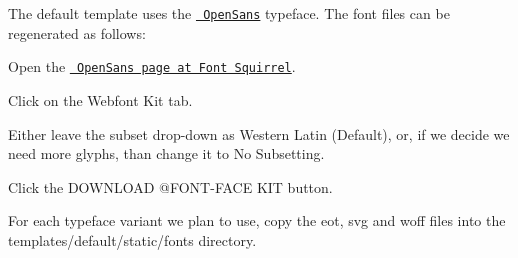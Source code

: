 The default template uses the \href{https://www.google.com/fonts/specimen/Open+Sans}{\texttt{ Open\+Sans}} typeface. The font files can be regenerated as follows\+:


\begin{DoxyEnumerate}
\item Open the \href{http://www.fontsquirrel.com/fonts/open-sans}{\texttt{ Open\+Sans page at Font Squirrel}}.
\item Click on the \textquotesingle{}Webfont Kit\textquotesingle{} tab.
\item Either leave the subset drop-\/down as \textquotesingle{}Western Latin (Default)\textquotesingle{}, or, if we decide we need more glyphs, than change it to \textquotesingle{}No Subsetting\textquotesingle{}.
\item Click the \textquotesingle{}D\+O\+W\+N\+L\+O\+AD @\+F\+O\+NT-\/F\+A\+CE K\+IT\textquotesingle{} button.
\item For each typeface variant we plan to use, copy the \textquotesingle{}eot\textquotesingle{}, \textquotesingle{}svg\textquotesingle{} and \textquotesingle{}woff\textquotesingle{} files into the \textquotesingle{}templates/default/static/fonts\textquotesingle{} directory. 
\end{DoxyEnumerate}